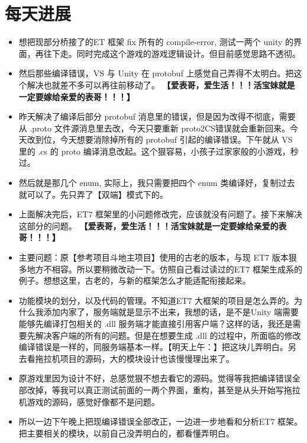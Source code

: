 \documentclass[9pt, b5paper]{article}
\begin{document}
\section{每天进展}
\label{sec-3}
\begin{itemize}
\item 想把现部分桥接了的ET 框架 fix 所有的 compile-error, 测试一两个 unity 的界面，再往下走。同时完成这个游戏的游戏逻辑设计。但目前感觉思路不透彻。
\item 然后那些编译错误，VS 与 Unity 在 protobuf 上感觉自己弄得不太明白。把这个解决也就差不多可以再往前移动了。 \textbf{【爱表哥，爱生活！！！活宝妹就是一定要嫁给亲爱的表哥！！！】}
\item 昨天解决了编译后部分 protobuf 消息里的错误，但是因为改得不彻底，需要从 .proto 文件源消息里去改，今天只要重新 proto2CS错误就会重新回来。今天改到位，今天想要消除掉所有的 protobuf 引起的编译错误。下午就从 VS 里的 .cs 的 proto 编译消息改起。这个狠容易，小孩子过家家般的小游戏，秒过。
\item 然后就是那几个 enum, 实际上，我只需要把四个 enum 类编译好，复制过去就可以了。先只弄了【双端】模式下的。
\item 上面解决完后，ET7 框架里的小问题修改完，应该就没有问题了。接下来解决这部分的问题。 \textbf{【爱表哥，爱生活！！！活宝妹就是一定要嫁给亲爱的表哥！！！】}
\item 主要问题：原【参考项目斗地主项目】使用的古老的版本，与现 ET7 版本狠多地方不相容。所以要稍微改动一下。仿照自己看过读过的ET7 框架生成系的例子。想想这里，古老的，与新的框架怎么才能适配衔接起来。
\item 功能模块的划分，以及代码的管理。不知道ET7 大框架的项目是怎么弄的。为什么我添加内家了，服务端就是显示不出来，我想的话，是不是Unity 端需要能够先编译打包相关的 .dll 服务端才能直接引用客户端？这样的话，我还是需要先解决客户端的所有的问题。但是在想要生成 .dll 的过程中，所面临的修改编译错误是一样的，同服务端基本一样。【明天上午：】把这块儿弄明白。另去看拖拉机项目的源码，大的模块设计也该慢慢理出来了。
\item 原游戏里因为设计不好，总感觉狠不想去看它的源码。觉得等我把编译错误全部改掉，等我可以真正测试前面的一两个界面，重构，甚至是从头开始写拖拉机游戏的源码，感觉好像都不是问题。
\item 所以一边下午晚上把现编译错误全部改正，一边进一步地看和分析ET7 框架。把主要相关的模块，以前自己没弄明白的，都看懂弄明白。
\end{itemize}
\end{document}
